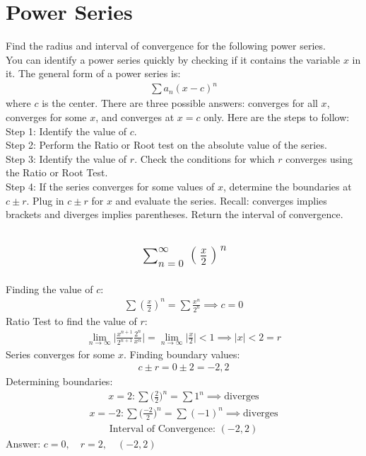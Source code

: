 \documentclass{article}
\begin{document}
\section{Power Series}
Find the radius and interval of convergence for the following power series. \\[10pt]
You can identify a power series quickly by checking if it contains the variable $x$ in it. The general form of a power series is:
\begin{align*}
	\sum a_n (x - c)^n
\end{align*}
where $c$ is the center. There are three possible answers: converges for all $x$, converges for some $x$, and converges at $x = c$ only. Here are the steps to follow: \\[10pt]
Step 1: Identify the value of $c$. \\[10pt]
Step 2: Perform the Ratio or Root test on the absolute value of the series. \\[10pt]
Step 3: Identify the value of $r$. Check the conditions for which $r$ converges using the Ratio or Root Test. \\[10pt]
Step 4: If the series converges for some values of $x$, determine the boundaries at $c \pm r$. Plug in $c \pm r$ for $x$ and evaluate the series. Recall: converges implies brackets and diverges implies parentheses. Return the interval of convergence. 
\subsection{
	\begin{align*}
		\sum_{n = 0}^\infty \left( \frac{x}{2} \right)^n
	\end{align*}
}
Finding the value of $c$:
\begin{align*}
	\sum \left( \frac{x}{2} \right)^n = \sum \frac{x^n}{2^n} \implies c = 0
\end{align*}
Ratio Test to find the value of $r$:
\begin{align*}
	\lim_{n \to \infty} \bigg| \frac{x^{n + 1}}{2^{n + 1}} \frac{2^n}{x^n} \bigg| = \lim_{n \to \infty} \bigg| \frac{x}{2} \bigg| < 1 \implies | x | < 2 = r
\end{align*}
Series converges for some $x$. Finding boundary values:
\begin{align*}
	c \pm r = 0 \pm 2 = -2, 2
\end{align*}
Determining boundaries:
\begin{align*}
	x = 2: \sum \bigg( \frac{2}{2} \bigg)^n = \sum 1^n \implies \text{diverges}
\end{align*}
\begin{align*}
	x = -2: \sum \bigg( \frac{-2}{2} \bigg)^n = \sum (-1)^n \implies \text{diverges}
\end{align*}
\begin{align*}
	\text{Interval of Convergence: } (-2, 2)
\end{align*}
Answer: $c = 0, \quad r = 2, \quad (-2, 2)$
\end{document}
